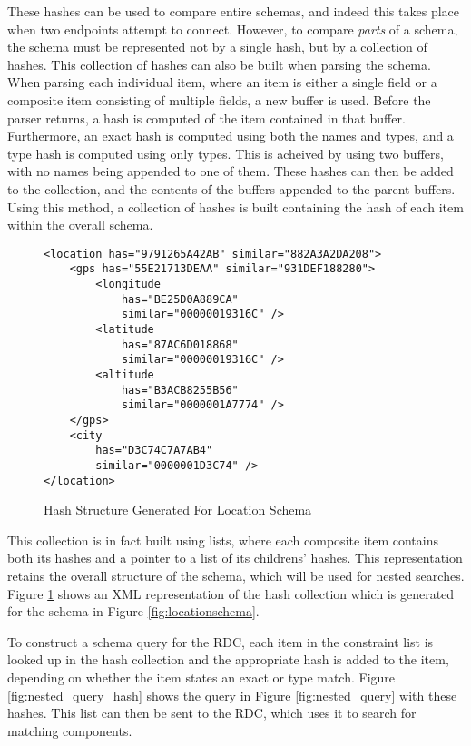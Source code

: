 \documentclass[12pt,twoside,notitlepage]{report}
\begin{document}
These hashes can be used to compare entire schemas, and indeed this takes place when two endpoints attempt to connect. 
However, to compare {\sl parts} of a schema, the schema must be represented not by a single hash, but by a collection of hashes. 
This collection of hashes can also be built when parsing the schema. 
When parsing each individual item, where an item is either a single field or a composite item consisting of multiple fields, a new buffer is used. 
Before the parser returns, a hash is computed of the item contained in that buffer. 
Furthermore, an exact hash is computed using both the names and types, and a type hash is computed using only types. 
This is acheived by using two buffers, with no names being appended to one of them. 
These hashes can then be added to the collection, and the contents of the buffers appended to the parent buffers. 
Using this method, a collection of hashes is built containing the hash of each item within the overall schema. 

\begin{figure}
\begin{lstlisting}
<location has="9791265A42AB" similar="882A3A2DA208">
	<gps has="55E21713DEAA" similar="931DEF188280">
		<longitude
			has="BE25D0A889CA" 
			similar="00000019316C" />
		<latitude
			has="87AC6D018868" 
			similar="00000019316C" />
		<altitude
			has="B3ACB8255B56" 
			similar="0000001A7774" />
	</gps>
	<city
		has="D3C74C7A7AB4"
		similar="0000001D3C74" />
</location>
\end{lstlisting}
\caption{Hash Structure Generated For Location Schema}
\label{fig:locationhashes}
\end{figure}


This collection is in fact built using lists, where each composite item contains both its hashes and a pointer to a list of its childrens' hashes.
This representation retains the overall structure of the schema, which will be used for nested searches. 
Figure \ref{fig:locationhashes} shows an XML representation of the hash collection which is generated for the schema in Figure \ref{fig:locationschema}.


To construct a schema query for the RDC, each item in the constraint list is looked up in the hash collection and the appropriate hash is added to the item, depending on whether the item states an exact or type match. 
Figure \ref{fig:nested_query_hash} shows the query in Figure \ref{fig:nested_query} with these hashes. 
This list can then be sent to the RDC, which uses it to search for matching components. 
\end{document}
